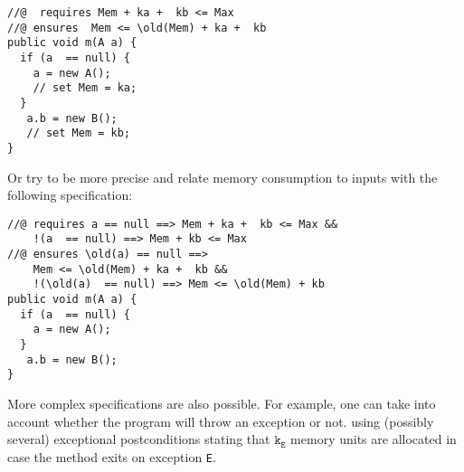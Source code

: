 \begin{lstlisting}[frame=trbl] 
//@  requires Mem + ka +  kb <= Max 
//@ ensures  Mem <= \old(Mem) + ka +  kb     
public void m(A a) {
  if (a  == null) {
    a = new A();
    // set Mem = ka;
  }  
   a.b = new B();
   // set Mem = kb;
}
\end{lstlisting}
Or try to be more precise and relate memory consumption to inputs with
the following specification:
\begin{lstlisting}[frame=trbl] 
//@ requires a == null ==> Mem + ka +  kb <= Max &&	 
    !(a  == null) ==> Mem + kb <= Max
//@ ensures \old(a) == null ==> 
    Mem <= \old(Mem) + ka +  kb && 
    !(\old(a)  == null) ==> Mem <= \old(Mem) + kb    
public void m(A a) {
  if (a  == null) {
    a = new A();
  }  
   a.b = new B();
}
\end{lstlisting}
More complex specifications are also possible. For example, one can
take into account whether the program will throw an exception or not.
using (possibly several) exceptional postconditions stating that
$\texttt{k}_{\texttt{E}}$ memory units are allocated in case the
method exits on exception \texttt{E}.




